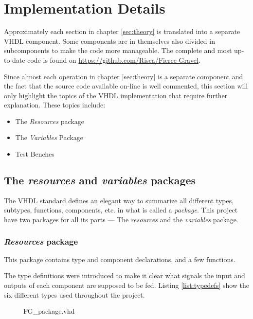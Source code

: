 \documentclass[report.tex]{subfiles}
\begin{document}
\chapter{Implementation Details}
\label{chap:implementation details}
Approximately each section in chapter \ref{sec:theory} is translated into a separate VHDL component. Some components are in themselves also divided in subcomponents to make the code more manageable. The complete and most up-to-date code is found on \url{https://github.com/Risca/Fierce-Gravel}.

Since almost each operation in chapter \ref{sec:theory} is a separate component and the fact that the source code available on-line is well commented, this section will only highlight the topics of the VHDL implementation that require further explanation. These topics include:

\begin{itemize}
\item The \emph{Resources} package
\item The \emph{Variables} Package
\item Test Benches
\end{itemize}

\section{The \emph{resources} and \emph{variables} packages}
The VHDL standard defines an elegant way to summarize all different types, subtypes, functions, components, etc. in what is called a \emph{package}. This project have two packages for all its parts --- The \emph{resources} and the \emph{variables} package.

\subsection{\emph{Resources} package}
This package contains type and component declarations, and a few functions.

The type definitions were introduced to make it clear what signals the input and outputs of each component are supposed to be fed.
Listing \ref{list:typedefs} show the six different types used throughout the project.

\begin{figure}[ht]

{FG_package.vhd}
\end{figure}
\end{document}
